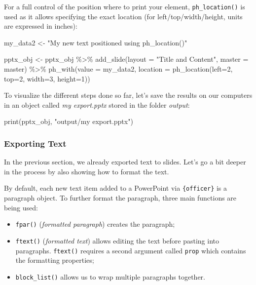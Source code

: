 \documentclass[
]{krantz}
\makeatletter
\newenvironment{Shaded}{\begin{snugshade}}{\end{snugshade}}
\newcommand{\AttributeTok}[1]{\textcolor[rgb]{0.61,0.61,0.61}{#1}}
\newcommand{\DecValTok}[1]{\textcolor[rgb]{0.06,0.06,0.06}{#1}}
\newcommand{\FunctionTok}[1]{\textcolor[rgb]{0,0,0}{#1}}
\newcommand{\NormalTok}[1]{#1}
\newcommand{\OtherTok}[1]{\textcolor[rgb]{0.37,0.37,0.37}{#1}}
\newcommand{\SpecialCharTok}[1]{\textcolor[rgb]{0,0,0}{#1}}
\newcommand{\StringTok}[1]{\textcolor[rgb]{0.5,0.5,0.5}{#1}}
\providecommand{\tightlist}{%
  \setlength{\itemsep}{0pt}\setlength{\parskip}{0pt}}
\newenvironment{kframe}{%
\medskip{}
\setlength{\fboxsep}{.8em}
 \def\at@end@of@kframe{}%
 \ifinner\ifhmode%
  \def\at@end@of@kframe{\end{minipage}}%
  \begin{minipage}{\columnwidth}%
 \fi\fi%
 \def\FrameCommand##1{\hskip\@totalleftmargin \hskip-\fboxsep
 \colorbox{shadecolor}{##1}\hskip-\fboxsep
     \hskip-\linewidth \hskip-\@totalleftmargin \hskip\columnwidth}%
 \MakeFramed {\advance\hsize-\width
   \@totalleftmargin\z@ \linewidth\hsize
   \@setminipage}}%
 {\par\unskip\endMakeFramed%
 \at@end@of@kframe}
\renewenvironment{Shaded}{\begin{kframe}}{\end{kframe}}
\makeatother
\begin{document}
For a full control of the position where to print your element, \texttt{ph\_location()} is used as it allows specifying the exact location (for left/top/width/height, units are expressed in inches):

\begin{Shaded}
\begin{Highlighting}[]
\NormalTok{my\_data2 }\OtherTok{\textless{}{-}} \StringTok{"My new text positioned using ph\_location()"}

\NormalTok{pptx\_obj }\OtherTok{\textless{}{-}}\NormalTok{ pptx\_obj }\SpecialCharTok{\%\textgreater{}\%}
  \FunctionTok{add\_slide}\NormalTok{(}\AttributeTok{layout =} \StringTok{"Title and Content"}\NormalTok{, }\AttributeTok{master =}\NormalTok{ master) }\SpecialCharTok{\%\textgreater{}\%} 
  \FunctionTok{ph\_with}\NormalTok{(}\AttributeTok{value =}\NormalTok{ my\_data2, }
          \AttributeTok{location =} \FunctionTok{ph\_location}\NormalTok{(}\AttributeTok{left=}\DecValTok{2}\NormalTok{, }\AttributeTok{top=}\DecValTok{2}\NormalTok{, }\AttributeTok{width=}\DecValTok{3}\NormalTok{, }\AttributeTok{height=}\DecValTok{1}\NormalTok{))}
\end{Highlighting}
\end{Shaded}

To visualize the different steps done so far, let's save the results on our computers in an object called \emph{my export.pptx} stored in the folder \emph{output}:

\begin{Shaded}
\begin{Highlighting}[]
\FunctionTok{print}\NormalTok{(pptx\_obj, }\StringTok{"output/my export.pptx"}\NormalTok{)}
\end{Highlighting}
\end{Shaded}

\hypertarget{exporting-text}{%
\subsubsection*{Exporting Text}\label{exporting-text}}


In the previous section, we already exported text to slides. Let's go a bit deeper in the process by also showing how to format the text.

By default, each new text item added to a PowerPoint via \texttt{\{officer\}} is a paragraph object. To further format the paragraph, three main functions are being used:

\begin{itemize}
\tightlist
\item
  \texttt{fpar()} (\emph{formatted paragraph}) creates the paragraph;
\item
  \texttt{ftext()} (\emph{formatted text}) allows editing the text before pasting into paragraphs. \texttt{ftext()} requires a second argument called \texttt{prop} which contains the formatting properties;
\item
  \texttt{block\_list()} allows us to wrap multiple paragraphs together.
\end{itemize}
\end{document}
